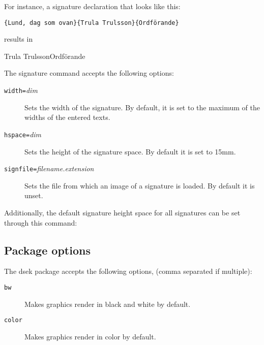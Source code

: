 \documentclass[a4paper, oneside]{ltxdoc}
\begin{document}
\begin{center}
\end{center}

For instance, a signature declaration that looks like this:

\begin{center}
  \texttt{\{Lund, dag som ovan\}\{Trula Trulsson\}\{Ordförande\}}
\end{center}

results in

\begin{center}
  \signature{Lund, dag som ovan}{Trula Trulsson}{Ordförande}
\end{center}

\noindent
The signature command accepts the following options:
\begin{description}
  \item[\texttt{width=}\textlangle\textit{dim}\textrangle] Sets the width of the
        signature.  By default, it is set to the maximum of the widths of the
        entered texts.
  \item[\texttt{hspace=}\textlangle\textit{dim}\textrangle] Sets the height of
        the signature space.  By default it is set to 15mm.
  \item[\texttt{signfile=}\textlangle\textit{filename.extension}\textrangle] Sets the file
        from which an image of a signature is loaded. By default it is unset.
\end{description}

\noindent
Additionally, the default signature height space for all signatures can be set
through this command:
\begin{center}
\end{center}

\subsection{Package options}
The \textsf{dsek} package accepts the following options, (comma separated if
multiple):

\begin{description}
  \item[\texttt{bw}] Makes graphics render in black and white by default.
  \item[\texttt{color}] Makes graphics render in color by default.
\end{description}
\end{document}

